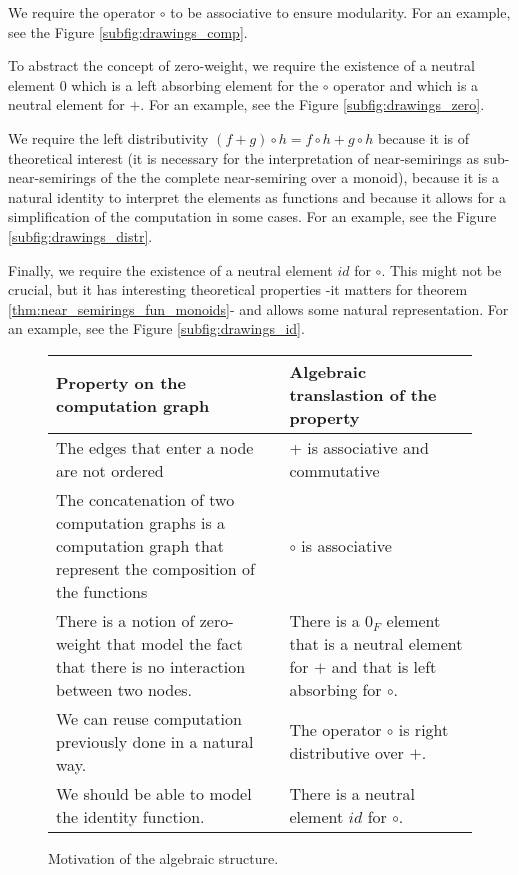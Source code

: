 \documentclass[11pt,a4paper]{article}
\theoremstyle{definition}
\begin{document}
	We require the operator $\circ$ to be associative to ensure modularity. For an example, see the Figure \ref{subfig:drawings_comp}.

	To abstract the concept of zero-weight, we require the existence of a neutral element $0$ which is a left absorbing element for the $\circ$ operator and which is a neutral element for $+$. For an example, see the Figure \ref{subfig:drawings_zero}.

	We require the left distributivity $(f+g) \circ h = f \circ h + g \circ h$ because it is of theoretical interest (it is necessary for the interpretation of near-semirings as sub-near-semirings of the the complete near-semiring over a monoid), because it is a natural identity to interpret the elements as functions and because it allows for a simplification of the computation in some cases. For an example, see the Figure \ref{subfig:drawings_distr}.

	Finally, we require the existence of a neutral element $id$ for $\circ$. This might not be crucial, but it has interesting theoretical properties -it matters for theorem \ref{thm:near_semirings_fun_monoids}- and allows some natural representation. For an example, see the Figure \ref{subfig:drawings_id}.
	\\

	\begin{figure}
		\centering
		\begin{tabular}{|C{7.5cm}|C{7.5cm}|}
			\hline 
			\textbf{Property on the computation graph} & \textbf{Algebraic translastion of the property} \\ 
			\hline 
			The edges that enter a node are not ordered & + is associative and commutative \\ 
			\hline
			The concatenation of two computation graphs is a computation graph that represent the composition of the functions & $\circ$ is associative \\ 
			\hline 
			There is a notion of zero-weight that model the fact that there is no interaction between two nodes. & There is a $0_F$ element that is a neutral element for $+$ and that is left absorbing for $\circ$. \\ 
			\hline 
			We can reuse computation previously done in a natural way. & The operator $\circ$ is right distributive over $+$. \\ 
			\hline 
			We should be able to model the identity function. & There is a neutral element $id$ for $\circ$. \\ 
			\hline 
		\end{tabular} 
	\caption{Motivation of the algebraic structure.}
	\label{fig:table_algebraic_structure}
	\end{figure}
\end{document}
